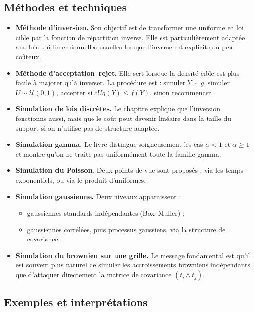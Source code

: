 \documentclass[11pt,a4paper]{article}
\begin{document}
\subsection{Méthodes et techniques}

\begin{itemize}
  \item \textbf{Méthode d'inversion.} Son objectif est de transformer une uniforme en loi cible par la fonction de répartition inverse. Elle est particulièrement adaptée aux lois unidimensionnelles usuelles lorsque l'inverse est explicite ou peu coûteux.
  \item \textbf{Méthode d'acceptation--rejet.} Elle sert lorsque la densité cible est plus facile à majorer qu'à inverser. La procédure est : simuler $Y\sim g$, simuler $U\sim\mathcal U(0,1)$, accepter si $cUg(Y)\le f(Y)$, sinon recommencer.
  \item \textbf{Simulation de lois discrètes.} Le chapitre explique que l'inversion fonctionne aussi, mais que le coût peut devenir linéaire dans la taille du support si on n'utilise pas de structure adaptée.
  \item \textbf{Simulation gamma.} Le livre distingue soigneusement les cas $\alpha<1$ et $\alpha\ge1$ et montre qu'on ne traite pas uniformément toute la famille gamma.
  \item \textbf{Simulation du Poisson.} Deux points de vue sont proposés : via les temps exponentiels, ou via le produit d'uniformes.
  \item \textbf{Simulation gaussienne.} Deux niveaux apparaissent :
  \begin{itemize}
    \item gaussiennes standards indépendantes (Box--Muller) ;
    \item gaussiennes corrélées, puis processus gaussiens, via la structure de covariance.
  \end{itemize}
  \item \textbf{Simulation du brownien sur une grille.} Le message fondamental est qu'il est souvent plus naturel de simuler les accroissements browniens indépendants que d'attaquer directement la matrice de covariance $(t_i\wedge t_j)$.
\end{itemize}

\subsection{Exemples et interprétations}
\end{document}
